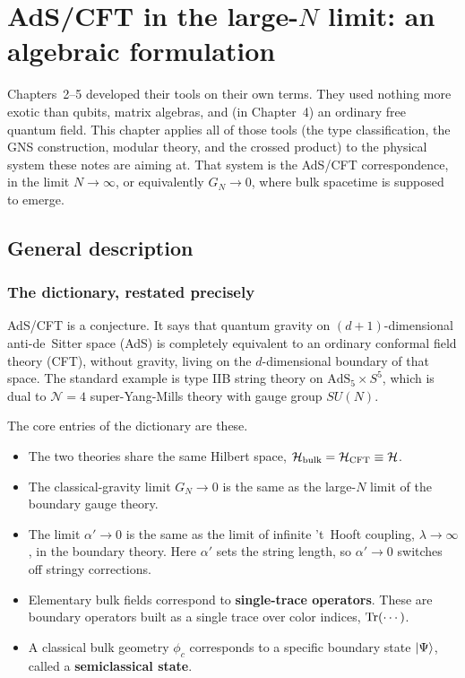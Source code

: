 \chapter{AdS/CFT in the large-\texorpdfstring{$N$}{N} limit: an algebraic formulation}

Chapters~2--5 developed their tools on their own terms. They used nothing more exotic than qubits, matrix
algebras, and (in Chapter~4) an ordinary free quantum field. This chapter applies all of those tools (the type
classification, the GNS construction, modular theory, and the crossed product) to the physical system these notes
are aiming at. That system is the AdS/CFT correspondence, in the limit $N\to\infty$, or equivalently $G_N\to0$,
where bulk spacetime is supposed to emerge.

\section{General description}

\subsection*{The dictionary, restated precisely}

AdS/CFT is a conjecture. It says that quantum gravity on $(d{+}1)$-dimensional anti-de~Sitter space (AdS) is
completely equivalent to an ordinary conformal field theory (CFT), without gravity, living on the
$d$-dimensional boundary of that space. The standard example is type IIB string theory on
$\text{AdS}_5\times S^5$, which is dual to $\mathcal N=4$ super-Yang-Mills theory with gauge group $SU(N)$.

The core entries of the dictionary are these.
\begin{itemize}
\item The two theories share the same Hilbert space, $\mathcal{H}_{\text{bulk}}=\mathcal{H}_{\text{CFT}}\equiv\mathcal{H}$.
\item The classical-gravity limit $G_N\to0$ is the same as the large-$N$ limit of the boundary gauge theory.
\item The limit $\alpha'\to0$ is the same as the limit of infinite 't~Hooft coupling, $\lambda\to\infty$, in the
boundary theory. Here $\alpha'$ sets the string length, so $\alpha'\to0$ switches off stringy corrections.
\item Elementary bulk fields correspond to \textbf{single-trace operators}. These are boundary operators built as
a single trace over color indices, $\operatorname{Tr}(\cdots)$.
\item A classical bulk geometry $\phi_c$ corresponds to a specific boundary state $\ket\Psi$, called a
\textbf{semiclassical state}.
\end{itemize}

